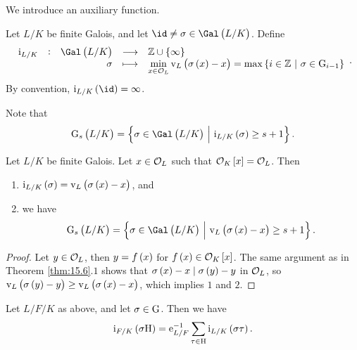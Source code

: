 We introduce an auxiliary function.

\begin{definition}
Let $ L / K $ be finite Galois, and let $ \id \ne \sigma \in \Gal\br{L / K} $. Define
$$ \function[\i_{L / K}]{\Gal\br{L / K}}{\ZZ \cup \cbr{\infty}}{\sigma}{\min_{x \in \OOO_L} \v_L\br{\sigma\br{x} - x} = \max \cbr{i \in \ZZ \st \sigma \in \G_{i - 1}}}. $$
By convention, $ \i_{L / K}\br{\id} = \infty $.
\end{definition}

Note that
$$ \G_s\br{L / K} = \cbr{\sigma \in \Gal\br{L / K} \st \i_{L / K}\br{\sigma} \ge s + 1}. $$

\pagebreak

\begin{lemma}
\label{lem:17.2}
Let $ L / K $ be finite Galois. Let $ x \in \mathcal{O}_L $ such that $ \OOO_K\sbr{x} = \OOO_L $. Then
\begin{enumerate}
\item $ \i_{L / K}\br{\sigma} = \v_L\br{\sigma\br{x} - x} $, and
\item we have
$$ \G_s\br{L / K} = \cbr{\sigma \in \Gal\br{L / K} \st \v_L\br{\sigma\br{x} - x} \ge s + 1}. $$
\end{enumerate}
\end{lemma}

\begin{proof}
Let $ y \in \mathcal{O}_L $, then $ y = f\br{x} $ for $ f\br{x} \in \OOO_K\sbr{x} $. The same argument as in Theorem \ref{thm:15.6}.$ 1 $ shows that $ \sigma\br{x} - x \mid \sigma\br{y} - y $ in $ \mathcal{O}_L $, so $ \v_L\br{\sigma\br{y} - y} \ge \v_L\br{\sigma\br{x} - x} $, which implies $ 1 $ and $ 2 $.
\end{proof}

\begin{proposition}
\label{prop:17.3}
Let $ L / F / K $ as above, and let $ \sigma \in \mathrm{G} $. Then we have
$$ \i_{F / K}\br{\sigma\H} = \e_{L / F}^{-1}\sum_{\tau \in \H} \i_{L / K}\br{\sigma\tau}. $$
\end{proposition}

